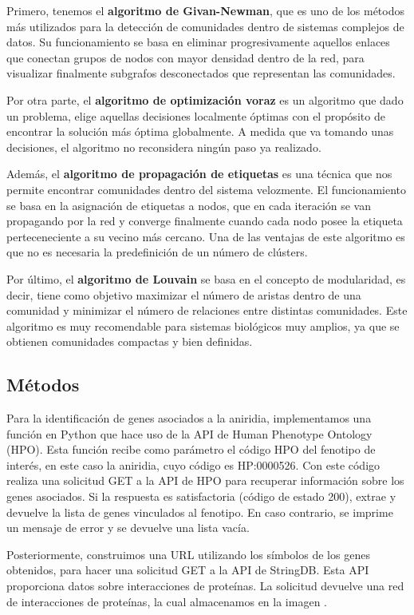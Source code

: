 Primero, tenemos el \textbf{algoritmo de Givan-Newman}, que es uno de los métodos más utilizados para la detección de comunidades dentro de sistemas complejos de datos. Su funcionamiento se basa en eliminar progresivamente aquellos enlaces que conectan grupos de nodos con mayor densidad dentro de la red, para visualizar finalmente subgrafos desconectados que representan las comunidades.

Por otra parte, el \textbf{algoritmo de optimización voraz} es un algoritmo que dado un problema, elige aquellas decisiones localmente óptimas con el propósito de encontrar la solución más óptima globalmente. A medida que va tomando unas decisiones, el algoritmo no reconsidera ningún paso ya realizado.

Además, el \textbf{algoritmo de propagación de etiquetas} es una técnica que nos permite encontrar comunidades dentro del sistema velozmente. El funcionamiento se basa en la asignación de etiquetas a nodos, que en cada iteración se van propagando por la red y converge finalmente cuando cada nodo posee la etiqueta perteceneciente a su vecino más cercano. Una de las ventajas de este algoritmo es que no es necesaria la predefinición de un número de clústers.

Por último, el \textbf{algoritmo de Louvain} se basa en el concepto de modularidad, es decir, tiene como objetivo maximizar el número de aristas dentro de una comunidad y minimizar el número de relaciones entre distintas comunidades. Este algoritmo es muy recomendable para sistemas biológicos muy amplios, ya que se obtienen comunidades compactas y bien definidas.

\subsection{Métodos}

Para la identificación de genes asociados a la aniridia, implementamos una función en Python que hace uso de la API de Human Phenotype Ontology (HPO). Esta función recibe como parámetro el código HPO del fenotipo de interés, en este caso la aniridia, cuyo código es HP:0000526. Con este código realiza una solicitud GET a la API de HPO para recuperar información sobre los genes asociados. Si la respuesta es satisfactoria (código de estado 200), extrae y devuelve la lista de genes vinculados al fenotipo. En caso contrario, se imprime un mensaje de error y se devuelve una lista vacía.

Posteriormente, construimos una URL utilizando los símbolos de los genes obtenidos, para hacer una solicitud GET a la API de StringDB. Esta API proporciona datos sobre interacciones de proteínas. La solicitud devuelve una red de interacciones de proteínas, la cual almacenamos en la imagen .

